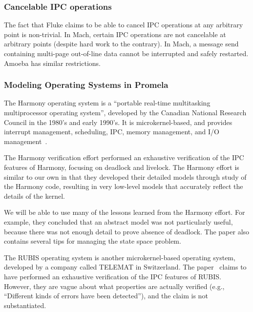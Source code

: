 \documentclass{article}
\begin{document}
\subsubsection*{Cancelable IPC operations}

The fact that Fluke claims to be able to cancel IPC operations at any
arbitrary point is non-trivial. 
In Mach, certain IPC operations are not cancelable at arbitrary points
(despite hard work to the contrary).  In Mach, a message send containing
multi-page out-of-line data cannot be interrupted and safely restarted.  
Amoeba has similar restrictions.   

\subsubsection*{Modeling Operating Systems in Promela}

The Harmony operating system is a ``portable real-time multitasking
multiprocessor operating system'', developed by the Canadian National
Research Council in the 1980's and early 1990's.  It is
microkernel-based, and provides interrupt management, scheduling, IPC,
memory management, and I/O management~\cite{Harmony-verify}.

The Harmony verification effort performed an exhaustive verification
of the IPC features of Harmony, focusing on deadlock and livelock.
The Harmony effort is similar to our own in that they developed their
detailed models through study of the Harmony code, resulting in very
low-level models that accurately reflect the details of the kernel.

We will be able to use many of the lessons learned from the Harmony
effort.  For example, they concluded that an abstract model was not
particularly useful, because there was not enough detail to prove 
absence of deadlock.  The paper also contains several tips for
managing the state space problem.  


The RUBIS operating system is another microkernel-based operating
system, developed by a company called TELEMAT in Switzerland.  The
paper~\cite{RUBIS-verify} 
claims to have performed an exhaustive verification of the IPC
features of RUBIS.  However, they are vague about what
properties are actually verified (e.g., ``Different kinds of errors
have been detected''), and the claim is not substantiated.
\end{document}
